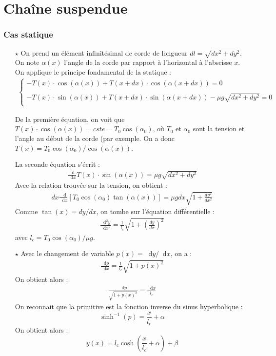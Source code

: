 \documentclass{report}
\newcommand*\dif{\mathop{}\!\mathrm{d}}
\begin{document}
\section*{Chaîne suspendue}

\subsubsection{Cas statique}

\begin{itemize}

	\item[$\star$] On prend un élément infinitésimal de corde de longueur $dl=\sqrt{dx^2+dy^2}$. On note $\alpha(x)$ l'angle de la corde par rapport à l'horizontal à l'abscisse $x$. On applique le principe fondamental de la statique :
	\begin{align*}
	\left\lbrace
	\begin{array}{ccc}
	-T(x)\cdot\cos(\alpha(x))+T(x+dx)\cdot\cos(\alpha(x+dx))=0\\
	\\
	-T(x)\cdot\sin(\alpha(x))+T(x+dx)\cdot\sin(\alpha(x+dx))-\mu g\sqrt{dx^2+dy^2}=0\\
	\end{array}\right.
	\end{align*}		
	
	De la première équation, on voit que $T(x)\cdot\cos(\alpha(x))=cste=T_0\cos(\alpha_0)$, où $T_0$ et $\alpha_0$ sont la tension et l'angle au début de la corde (par exemple. On a donc $T(x)=T_0\cos(\alpha_0)/\cos(\alpha(x))$.
	
	La seconde équation s'écrit :
	\begin{align*}
		\frac{\dif }{\dif x}T(x)\cdot\sin(\alpha(x))=\mu g \sqrt{dx^2+dy^2}
	\end{align*}
	Avec la relation trouvée sur la tension, on obtient :
	\begin{align*}
		dx\frac{\dif }{\dif x}\left[T_0\cos(\alpha_0)\tan(\alpha(x))\right] =\mu g dx\sqrt{1+\frac{dy^2}{dx^2}}
	\end{align*}
	Comme $\tan(x)=dy/dx$, on tombe sur l'équation différentielle :
	\begin{align*}
		\frac{\dif^2 y}{\dif x^2} =\frac{1}{l_c}\sqrt{1+\left( \frac{dy}{dx}\right)^2}
	\end{align*}	
	avec $l_c=T_0\cos(\alpha_0)/\mu g$.
	\item[$\star$] Avec le changement de variable $p(x)=\dif y/\dif x$, on a :
	\begin{align*}
		\frac{\dif p}{\dif x} =\frac{1}{l_c}\sqrt{1+p(x)^2}
	\end{align*}	
	On obtient alors :
	\begin{align*}
		\frac{\dif p}{\sqrt{1+p(x)^2}} =\frac{\dif x}{l_c}
	\end{align*}	
	On reconnait que la primitive est la fonction inverse du sinus hyperbolique :
	\begin{equation}
		\sinh^{-1}(p)=\frac{x}{l_c} +\alpha
	\end{equation}
	On obtient alors :
	\begin{equation}
		y(x) = l_c\cosh\left( \frac{x}{l_c}+\alpha\right) +\beta
	\end{equation}
	

\end{itemize}
\end{document}
